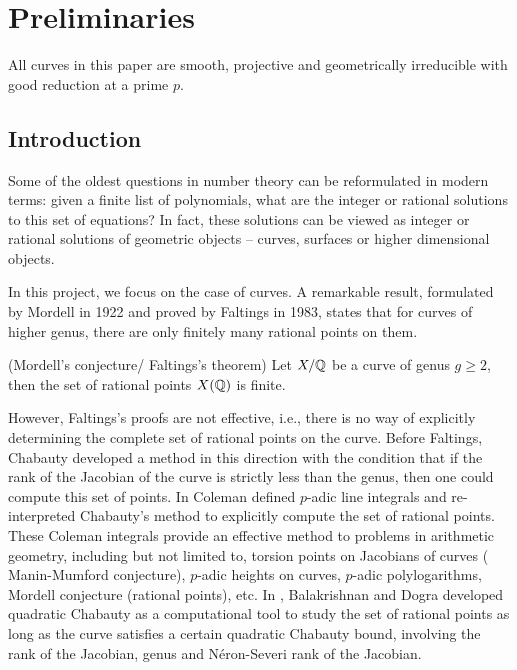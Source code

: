 \chapter{Preliminaries}

All curves in this paper are smooth, projective and geometrically irreducible with good reduction at a prime $p$.

\section{Introduction}

Some of the oldest questions in number theory can be reformulated in modern terms: given a finite list of polynomials, what are the integer or rational solutions to this set of equations? In fact, these solutions can be viewed as integer or rational solutions of geometric objects -- curves, surfaces or higher dimensional objects.

In this project, we focus on the case of curves. A remarkable result, formulated by Mordell in 1922 and proved by Faltings in 1983, states that for curves of higher genus, there are only finitely many rational points on them. 

\begin{theorem}{(Mordell's conjecture/ Faltings's theorem)} Let $X/\mathbb{Q}$ be a curve of genus $g \geq 2$, then the set of rational points $X(\mathbb{Q})$ is finite.
\end{theorem}

However, Faltings's proofs are not effective, i.e., there is no way of explicitly determining the complete set of rational points on the curve. Before Faltings, Chabauty developed a method in this direction with the condition that if the rank of the Jacobian of the curve is strictly less than the genus, then one could compute this set of points. In \cite{Coleman2,Coleman3} Coleman defined $p$-adic line integrals and re-interpreted Chabauty's method to explicitly compute the set of rational points. These Coleman integrals provide an effective method to problems in arithmetic geometry, including but not limited to, torsion points on Jacobians of curves ( Manin-Mumford conjecture), $p$-adic heights on curves, $p$-adic polylogarithms, Mordell conjecture (rational points), etc. In \cite{BD1,BD2}, Balakrishnan and Dogra developed quadratic Chabauty as a computational tool to study the set of rational points as long as the curve satisfies a certain quadratic Chabauty bound, involving the rank of the Jacobian, genus and N\'{e}ron-Severi rank of the Jacobian.

